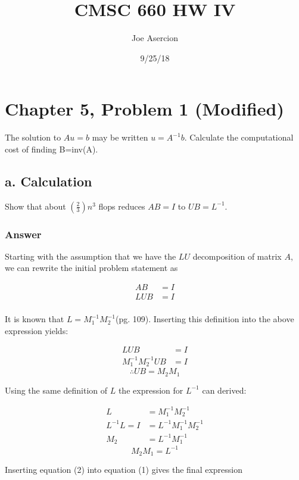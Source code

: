 \documentclass{article}
\title{CMSC 660 HW IV}
\date{9/25/18}
\author{Joe Asercion}
\begin{document}
	\maketitle
	\section{Chapter 5, Problem 1 (Modified)}
	The solution to $Au=b$ may be written $u=A^{-1}b$.  Calculate the computational cost of finding B=inv(A).
	
		\subsection{a. Calculation}
		Show that about $(\frac{2}{3})n^{3}$ flops reduces $AB=I$ to $UB=L^{-1}$.
	
		\subsubsection{Answer}
		Starting with the assumption that we have the $LU$ decomposition of matrix $A$, we can rewrite the initial problem statement as 
		
		\begin{align*}
			AB&=I\\
			LUB&=I\\
		\end{align*}
		
		It is known that $L=M_{1}^{-1}M_{2}^{-1}$\cite{BG}(pg. 109).  Inserting this definition into the above expression yields:
		
		\begin{align*}
			LUB&=I\\
			M_{1}^{-1}M_{2}^{-1}UB&=I
		\end{align*}
		\begin{equation}
			\therefore UB=M_{2}M_{1}
		\end{equation}
		
		Using the same definition of $L$ the expression for $L^{-1}$ can derived:
		
		\begin{align*}
			L&=M_{1}^{-1}M_{2}^{-1}\\
			L^{-1}L=I&=L^{-1}M_{1}^{-1}M_{2}^{-1}\\
			M_{2}&=L^{-1}M_{1}^{-1}
		\end{align*}
		\begin{equation}
			M_{2}M_{1}=L^{-1}
		\end{equation}
		
		Inserting equation (2) into equation (1) gives the final expression
		
\end{document}
